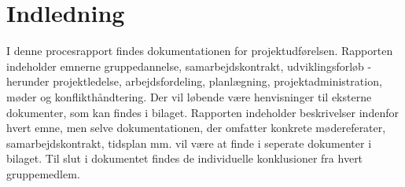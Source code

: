 \chapter{Indledning}
I denne procesrapport findes dokumentationen for projektudførelsen. Rapporten indeholder emnerne gruppedannelse, samarbejdskontrakt, udviklingsforløb - herunder projektledelse, arbejdsfordeling, planlægning, projektadministration, møder og konflikthåndtering. Der vil løbende være henvisninger til eksterne dokumenter, som kan findes i bilaget. Rapporten indeholder beskrivelser indenfor hvert emne, men selve dokumentationen, der omfatter konkrete mødereferater, samarbejdskontrakt, tidsplan mm. vil være at finde i seperate dokumenter i bilaget. Til slut i dokumentet findes de individuelle konklusioner fra hvert gruppemedlem.
